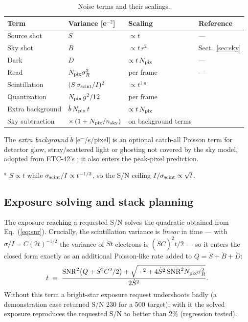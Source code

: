 \begin{table}
\centering
\caption{Noise terms and their scalings.}
\label{tab:noise}
\begin{tabular}{llll}
\toprule
Term & Variance [e$^{-2}$] & Scaling & Reference \\
\midrule
Source shot     & $S$ & $\propto t$ & --- \\
Sky shot        & $B$ & $\propto t\,r^2$ & Sect.~\ref{sec:sky} \\
Dark            & $D$ & $\propto t\,N_{\rm pix}$ & --- \\
Read            & $N_{\rm pix}\sigma_R^2$ & per frame & --- \\
Scintillation   & $(S\,\sigma_{\rm scint}/I)^2$ & $\propto t^{1}$\,$^{a}$ &
\citet{young1967,osborn2015} \\
Quantization    & $N_{\rm pix}\,g^2/12$ & per frame & \citet{janesick2001} \\
Extra background & $\dot b\,N_{\rm pix}\,t$ & $\propto t\,N_{\rm pix}$ & \citet{etc42} \\
Sky subtraction & $\times\,(1 + N_{\rm pix}/n_{\rm sky})$ & on background terms & \citet{merline1995} \\
\bottomrule
\end{tabular}

\smallskip
{\footnotesize The \emph{extra background} $\dot b$ [e$^-$/s/pixel] is an
optional catch-all Poisson term for detector glow, stray/scattered light or
ghosting not covered by the sky model, adopted from ETC-42's
; it also enters the peak-pixel prediction.}

\smallskip
{\footnotesize $^{a}$ $S \propto t$ while $\sigma_{\rm scint}/I \propto
t^{-1/2}$, so the S/N ceiling $I/\sigma_{\rm scint} \propto \sqrt{t}$.}
\end{table}

\subsection{Exposure solving and stack planning}
\label{sec:stack}

The exposure reaching a requested S/N solves the quadratic obtained from
Eq.~(\ref{eq:snr}). Crucially, the scintillation variance is \emph{linear}
in time — with $\sigma/I = C(2t)^{-1/2}$ the variance of $\dot S t$
electrons is $(\dot S C)^2 t/2$ — so it enters the closed form exactly as
an additional Poisson-like rate added to $Q = \dot S + \dot B + \dot D$:
\begin{equation}
  t \;=\; \frac{\mathrm{SNR}^2\big(Q + \dot S^2 C^2/2\big)
  + \sqrt{\;\cdot\;^2 + 4\dot S^2\,\mathrm{SNR}^2 N_{\rm pix}\sigma_R^2}}
  {2\dot S^2}.
  \label{eq:texp}
\end{equation}
Without this term a bright-star exposure request undershoots badly (a
demonstration case returned S/N 230 for a 500 target); with it the solved
exposure reproduces the requested S/N to better than 2\% (regression
tested).

